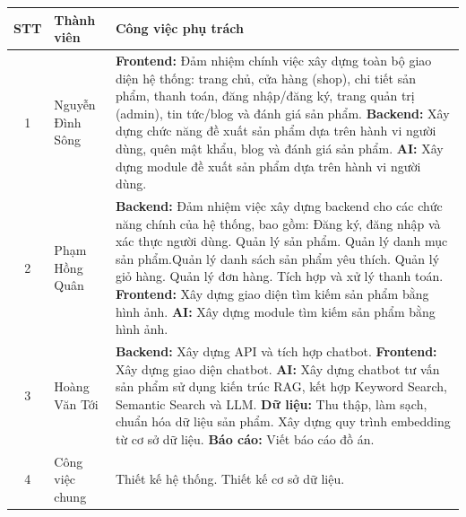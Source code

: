 \documentclass{report}
\begin{document}
\begin{table}[htbp]
    \centering
    \label{tab:phan-chia-cong-viec}
    \renewcommand{\arraystretch}{1.4}
    \begin{tabular}{|c|p{3.5cm}|p{8cm}|}
        \hline
        \textbf{STT} &
        \textbf{Thành viên} &
        \textbf{Công việc phụ trách} \\
        \hline

        1 & Nguyễn Đình Sông &
        \textbf{Frontend:} Đảm nhiệm chính việc xây dựng toàn bộ giao diện hệ thống: 
        trang chủ, cửa hàng (shop), chi tiết sản phẩm, thanh toán, 
        đăng nhập/đăng ký, trang quản trị (admin), tin tức/blog và đánh giá sản phẩm.\newline
        \textbf{Backend:} Xây dựng chức năng đề xuất
        sản phẩm dựa trên hành vi người dùng,
        quên mật khẩu, blog và đánh giá sản phẩm.\newline
        \textbf{AI:} Xây dựng module đề xuất sản phẩm
        dựa trên hành vi người dùng. \\
        \hline

        2 & Phạm Hồng Quân &
        \textbf{Backend:} Đảm nhiệm việc xây dựng backend cho các chức năng chính của hệ thống, bao gồm: 
        Đăng ký, đăng nhập và xác thực người dùng. Quản lý sản phẩm. Quản lý danh mục sản phẩm.Quản lý danh sách sản phẩm
         yêu thích. 
        Quản lý giỏ hàng. Quản lý đơn hàng. Tích hợp và xử lý thanh toán.\newline
        \textbf{Frontend:} Xây dựng giao diện tìm kiếm
        sản phẩm bằng hình ảnh.\newline
        \textbf{AI:} Xây dựng module tìm kiếm
        sản phẩm bằng hình ảnh. \\
        \hline

        3 & Hoàng Văn Tới &
        \textbf{Backend:} Xây dựng API và tích hợp chatbot.\newline
        \textbf{Frontend:} Xây dựng giao diện chatbot.\newline
        \textbf{AI:} Xây dựng chatbot tư vấn sản phẩm sử dụng kiến trúc RAG, 
        kết hợp Keyword Search, Semantic Search và LLM.\newline
        \textbf{Dữ liệu:} Thu thập, làm sạch, chuẩn hóa dữ liệu sản phẩm. 
        Xây dựng quy trình embedding từ cơ sở dữ liệu. \newline
        \textbf{Báo cáo:} Viết báo cáo đồ án. \\
        \hline

        4 & Công việc chung &
        Thiết kế hệ thống.\newline
        Thiết kế cơ sở dữ liệu. \\
        \hline

    \end{tabular}
\end{table}
\end{document}
